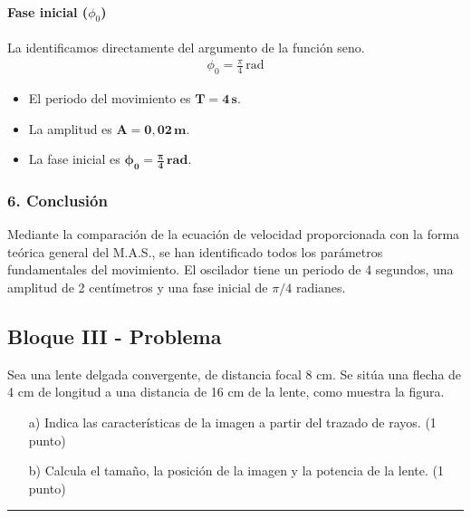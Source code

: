\paragraph{Fase inicial ($\phi_0$)}
La identificamos directamente del argumento de la función seno.
\begin{gather}
    \phi_0 = \frac{\pi}{4} \, \text{rad}
\end{gather}
\begin{cajaresultado}
\begin{itemize}
    \item El periodo del movimiento es $\boldsymbol{T = 4 \, \textbf{s}}$.
    \item La amplitud es $\boldsymbol{A = 0,02 \, \textbf{m}}$.
    \item La fase inicial es $\boldsymbol{\phi_0 = \frac{\pi}{4} \, \textbf{rad}}$.
\end{itemize}
\end{cajaresultado}

\subsubsection*{6. Conclusión}
\begin{cajaconclusion}
Mediante la comparación de la ecuación de velocidad proporcionada con la forma teórica general del M.A.S., se han identificado todos los parámetros fundamentales del movimiento. El oscilador tiene un periodo de 4 segundos, una amplitud de 2 centímetros y una fase inicial de $\pi/4$ radianes.
\end{cajaconclusion}

\newpage
\subsection{Bloque III - Problema}
\label{subsec:III_B_2013_jun_ord}

\begin{cajaenunciado}
Sea una lente delgada convergente, de distancia focal 8 cm. Se sitúa una flecha de 4 cm de longitud a una distancia de 16 cm de la lente, como muestra la figura.
\begin{enumerate}
    \item[a)] Indica las características de la imagen a partir del trazado de rayos. (1 punto)
    \item[b)] Calcula el tamaño, la posición de la imagen y la potencia de la lente. (1 punto)
\end{enumerate}
\end{cajaenunciado}
\hrule

